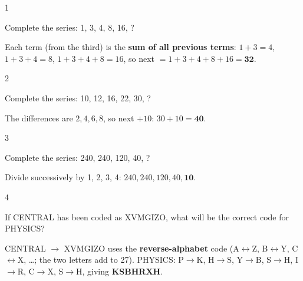 \begin{question}{1}
{Complete the series: 1, 3, 4, 8, 16, ?\par}
\begin{explain}
Each term (from the third) is the \textbf{sum of all previous terms}: $1+3=4$, $1+3+4=8$, $1+3+4+8=16$, so next $=1+3+4+8+16=\mathbf{32}$.
\end{explain}
\end{question}

\begin{question}{2}
{Complete the series: 10, 12, 16, 22, 30, ?\par}
\begin{explain}
The differences are $2, 4, 6, 8$, so next $+10$: $30+10=\mathbf{40}$.
\end{explain}
\end{question}

\begin{question}{3}
{Complete the series: 240, 240, 120, 40, ?\par}
\begin{explain}
Divide successively by 1, 2, 3, 4: $240, 240, 120, 40, \mathbf{10}$.
\end{explain}
\end{question}

\begin{question}{4}
{If CENTRAL has been coded as XVMGIZO, what will be the correct code for PHYSICS?\par}
\begin{explain}
CENTRAL $\rightarrow$ XVMGIZO uses the \textbf{reverse-alphabet} code (A$\leftrightarrow$Z, B$\leftrightarrow$Y, C$\leftrightarrow$X, \ldots; the two letters add to 27).
PHYSICS: P$\rightarrow$K, H$\rightarrow$S, Y$\rightarrow$B, S$\rightarrow$H, I$\rightarrow$R, C$\rightarrow$X, S$\rightarrow$H, giving \textbf{KSBHRXH}.
\end{explain}
\end{question}

